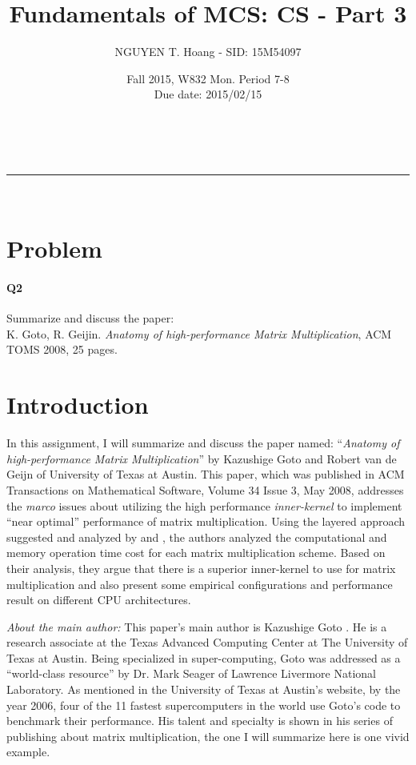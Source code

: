 \documentclass[a4paper,12pt]{article}
\makeatletter
\newcommand{\linia}{\rule{\linewidth}{0.5pt}}
\renewcommand{\maketitle} {
\begin{center}
\vspace{2ex}
{\huge \textsc{\@title}}
\vspace{1ex}
\\
\linia\\
\@author \hfill \@date
\vspace{4ex}
\end{center}
}
\makeatother
\begin{document}

\title{Fundamentals of MCS: CS - Part 3}

\author{NGUYEN T. Hoang - SID: 15M54097}

\date{Fall 2015, W832 Mon. Period 7-8 \\ \hfill Due date: 2015/02/15}

\maketitle

\vfill
\section*{Problem}
\noindent
\paragraph{Q2} Summarize and discuss the paper: \\
\hspace{3em} K. Goto, R. Geijin. \emph{Anatomy of high-performance Matrix Multiplication}, ACM TOMS 2008, 25 pages.
\vfill
\pagebreak




\section{Introduction}

\noindent
In this assignment, I will summarize and discuss the paper named: ``\emph{Anatomy of high-performance Matrix Multiplication}'' by Kazushige Goto and Robert van de Geijn of University of Texas at Austin. This paper, which was published in ACM Transactions on Mathematical Software, Volume 34 Issue 3, May 2008, addresses the \emph{marco} issues about utilizing the high performance \emph{inner-kernel} to implement ``near optimal'' performance of matrix multiplication. Using the layered approach suggested and analyzed by \cite{gunnels2001} and \cite{gunnels2005}, the authors analyzed the computational and memory operation time cost for each matrix multiplication scheme. Based on their analysis, they argue that there is a superior inner-kernel to use for matrix multiplication and also present some empirical configurations and performance result on different CPU architectures.

\emph{About the main author: } This paper's main author is Kazushige Goto \cite{gototx}. He is a research associate at the Texas Advanced Computing Center at The University of Texas at Austin. Being specialized in super-computing, Goto was addressed as a ``world-class resource'' by Dr. Mark Seager of Lawrence Livermore National Laboratory. As mentioned in the University of Texas at Austin's website, by the year 2006, four of the 11 fastest supercomputers in the world use Goto's code to benchmark their performance. His talent and specialty is shown in his series of publishing about matrix multiplication, the one I will summarize here is one vivid example.
\end{document}

